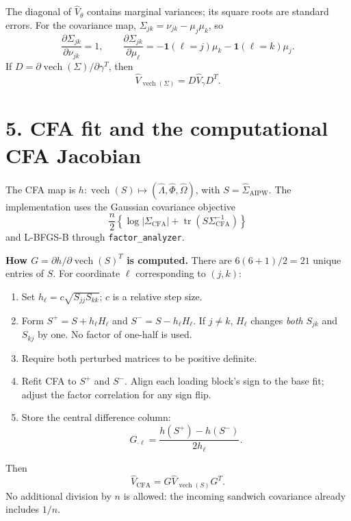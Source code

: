 \documentclass[10pt]{article}
\newcommand{\vech}{\operatorname{vech}}
\begin{document}
The diagonal of $\widehat V_\theta$ contains marginal variances; its square roots are standard errors. For the covariance map, $\Sigma_{jk}=\nu_{jk}-\mu_j\mu_k$, so
\[
\frac{\partial\Sigma_{jk}}{\partial\nu_{jk}}=1,\qquad
\frac{\partial\Sigma_{jk}}{\partial\mu_\ell}
=-\mathbf1(\ell=j)\mu_k-\mathbf1(\ell=k)\mu_j.
\]
If $D=\partial\vech(\Sigma)/\partial\gamma^T$, then
\[
\widehat V_{\vech(\Sigma)}=D\widehat V_\gamma D^T.
\]

\section*{5. CFA fit and the computational CFA Jacobian}
The CFA map is $h:\vech(S)\mapsto(\hat\Lambda,\hat\Phi,\hat\Omega)$, with $S=\hat\Sigma_{\mathrm{AIPW}}$. The implementation uses the Gaussian covariance objective
\[
\frac{n}{2}\left\{\log|\Sigma_{\mathrm{CFA}}|+\operatorname{tr}(S\Sigma_{\mathrm{CFA}}^{-1})\right\}
\]
and L-BFGS-B through \texttt{factor\_analyzer}.

\textbf{How $G=\partial h/\partial\vech(S)^T$ is computed.}
There are $6(6+1)/2=21$ unique entries of $S$. For coordinate $\ell$ corresponding to $(j,k)$:
\begin{enumerate}[nosep,leftmargin=18pt]
\item Set $h_\ell=c\sqrt{S_{jj}S_{kk}}$; $c$ is a relative step size.
\item Form $S^+=S+h_\ell H_\ell$ and $S^-=S-h_\ell H_\ell$. If $j\ne k$, $H_\ell$ changes \emph{both} $S_{jk}$ and $S_{kj}$ by one. No factor of one-half is used.
\item Require both perturbed matrices to be positive definite.
\item Refit CFA to $S^+$ and $S^-$. Align each loading block's sign to the base fit; adjust the factor correlation for any sign flip.
\item Store the central difference column:
\[
G_{\cdot\ell}=\frac{h(S^+)-h(S^-)}{2h_\ell}.
\]
\end{enumerate}

Then
\[
\widehat V_{\mathrm{CFA}}=G\widehat V_{\vech(S)}G^T.
\]
No additional division by $n$ is allowed: the incoming sandwich covariance already includes $1/n$.
\end{document}
